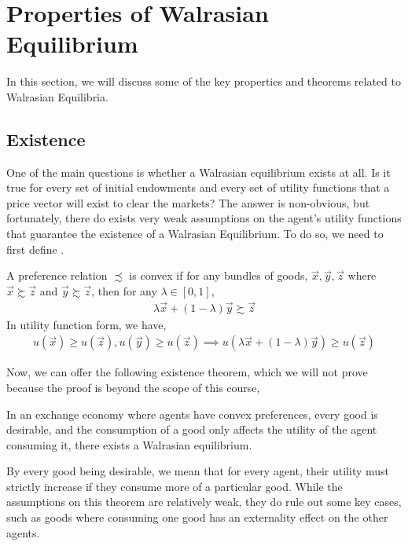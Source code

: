 \section{Properties of Walrasian Equilibrium}
In this section, we will discuss some of the key properties and theorems related to Walrasian Equilibria.

\subsection*{Existence}
One of the main questions is whether a Walrasian equilibrium exists at all. Is it true for every set of initial endowments and every set of utility functions that a price vector will exist to clear the markets? The answer is non-obvious, but fortunately, there do exists very weak assumptions on the agent's utility functions that guarantee the existence of a Walrasian Equilibrium. To do so, we need to first define .

\begin{definition*}
    A preference relation $\precsim$ is convex if for any bundles of goods, $\vec{x}, \vec{y}, \vec{z}$ where $\vec{x} \succsim \vec{z} $ and $\vec{y} \succsim \vec{z}$, then for any $\lambda \in [0, 1]$,
    \begin{align*}
        \lambda \vec{x} + (1 - \lambda) \vec{y} \succsim \vec{z}
    \end{align*}
    In utility function form, we have,
    \begin{align*}
        u(\vec{x}) \geq u(\vec{z}), u(\vec{y}) \geq u(\vec{z}) \implies u(\lambda \vec{x} + (1 - \lambda)\vec{y}) \geq u(\vec{z})
    \end{align*}
\end{definition*}

Now, we can offer the following existence theorem, which we will not prove because the proof is beyond the scope of this course,
\begin{theorem*}
    In an exchange economy where agents have convex preferences, every good is desirable, and the consumption of a good only affects the utility of the agent consuming it, there exists a Walrasian equilibrium. 
\end{theorem*}
By every good being desirable, we mean that for every agent, their utility must strictly increase if they consume more of a particular good. While the assumptions on this theorem are relatively weak, they do rule out some key cases, such as goods where consuming one good has an externality effect on the other agents.

